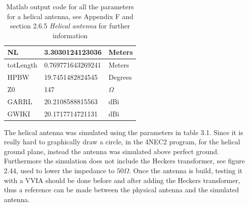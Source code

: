 \begin{table}[h!]
\begin{tabular}{|l|l|l|}
NL        & 3.3030124123036    & Meters                 \\ \hline
totLength & 0.769771643269241  & Meters                 \\ \hline
HPBW      & 19.7451482824545   & Degrees                \\ \hline
Z0        & 147                & $\Omega$               \\ \hline
GARRL     & 20.2108588815563   & dBi                    \\ \hline
GWIKI     & 20.1717714721131   & dBi                    \\ \hline
\end{tabular}
\caption{Matlab output code for all the parameters for a helical antenna, see Appendix F and section 2.6.5 \textit{Helical antenna} for further information}
\end{table}

The helical antenna was simulated using the parameters in table 3.1. Since it is really hard to graphically draw a circle, in the 4NEC2 program, for the helical ground plane, instead the antenna was simulated above perfect ground. Furthermore the simulation does not include the Heckers transformer, see figure 2.44,  used to lower the impedance to $50\Omega$. Once the antenna is build, testing it with a VVIA should be done before and after adding the Heckers transformer, thus a reference can be made between the physical antenna and the simulated antenna.


